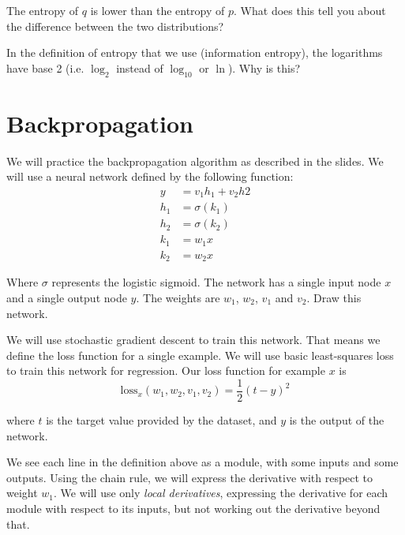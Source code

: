 \documentclass[11pt]{article}
\begin{document}
The entropy of $q$ is lower than the entropy of $p$. What does this tell you about the difference between the two distributions?



In the definition of entropy that we use (information entropy), the logarithms have base 2 (i.e. $\log_2$ instead of $\log_{10}$ or $\ln$). Why is this?



\section{Backpropagation}


We will practice the backpropagation algorithm as described in the slides. We will use a neural network defined by the following function:
\begin{align*}
y &= v_1h_1 + v_2h2 \\
h_1 &= \sigma(k_1) \\
h_2 &= \sigma(k_2) \\
k_1 &= w_1x \\
k_2 &= w_2x 
\end{align*}

Where $\sigma$ represents the logistic sigmoid. The network has a single input node $x$ and a single output node $y$. The weights are $w_1$, $w_2$, $v_1$ and $v_2$. Draw this network. 



We will use stochastic gradient descent to train this network. That means we define the loss function for a single example. We will use basic least-squares loss to train this network for regression. Our loss function for example $x$ is
\[
\text{loss}_x(w_1, w_2, v_1, v_2) = \frac{1}{2}\left(t - y\right)^2
\]

where $t$ is the target value provided by the dataset, and $y$ is the output of the network.

We see each line in the definition above as a module, with some inputs and some outputs. Using the chain rule, we will express the derivative with respect to weight $w_1$. We will use only \emph{local derivatives}, expressing the derivative for each module with respect to its inputs, but not working out the derivative beyond that.
\end{document}
